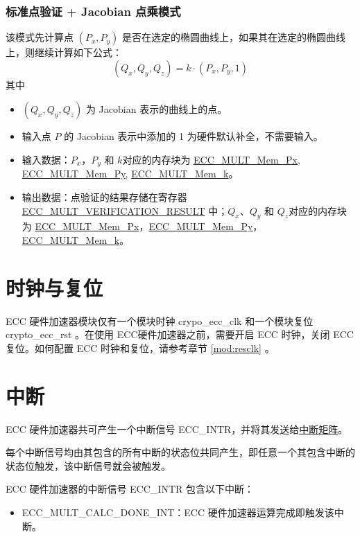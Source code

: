 \documentclass[main\_\_CN.tex]{subfiles}
\begin{document}
\subsubsection{标准点验证 + Jacobian 点乘模式}

该模式先计算点 $(P_x,P_y)$ 是否在选定的椭圆曲线上，如果其在选定的椭圆曲线上，则继续计算如下公式：
\[
(Q_x,Q_y,Q_z) = k \cdot (P_x,P_y,1)
\]
其中
\begin{itemize}
    \item $(Q_x,Q_y,Q_z)$ 为 Jacobian 表示的曲线上的点。
    \item 输入点 $P$ 的 Jacobian 表示中添加的 1 为硬件默认补全，不需要输入。
    \item 输入数据：$P_x$，$P_y$ 和 $k$对应的内存块为 \hyperref[tab:ecc-memory]{ECC\_MULT\_Mem\_Px}, \hyperref[tab:ecc-memory]{ECC\_MULT\_Mem\_Py}, \hyperref[tab:ecc-memory]{ECC\_MULT\_Mem\_k}。
    \item 输出数据：点验证的结果存储在寄存器 \hyperref[fielddesc:ECCMULTVERIFICATIONRESULT]{ECC\_MULT\_VERIFICATION\_RESULT} 中；$Q_x$、$Q_y$ 和 $Q_z$对应的内存块为 \hyperref[tab:ecc-memory]{ECC\_MULT\_Mem\_Px}，\hyperref[tab:ecc-memory]{ECC\_MULT\_Mem\_Py}，\hyperref[tab:ecc-memory]{ECC\_MULT\_Mem\_k}。
\end{itemize}

\section{时钟与复位}
\chipname{} ECC 硬件加速器模块仅有一个模块时钟 crypo\_ecc\_clk 和一个模块复位 crypto\_ecc\_rst 。在使用 ECC硬件加速器之前，需要开启 ECC 时钟，关闭 ECC 复位。如何配置 ECC 时钟和复位，请参考章节 \ref{mod:resclk} \textit{}。

\clearpage
\section{中断}
\label{sec:ecc-interrupt}

\chipname{} ECC 硬件加速器共可产生一个中断信号 ECC\_INTR，并将其发送给\hyperref[mod:intmtrx]{中断矩阵}。

\begin{tiplisting}
每个中断信号均由其包含的所有中断的状态位共同产生，即任意一个其包含中断的状态位触发，该中断信号就会被触发。
\end{tiplisting}

ECC 硬件加速器的中断信号 ECC\_INTR 包含以下中断：
\begin{itemize}
    \item \label{int:ECCMULTCALCDONEINT}ECC\_MULT\_CALC\_DONE\_INT：ECC 硬件加速器运算完成即触发该中断。
\end{itemize}
\end{document}

